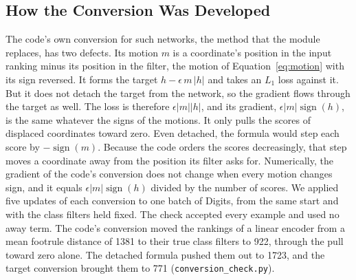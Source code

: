 \subsection{How the Conversion Was Developed}\label{supp:learned-development}

The code's own conversion for such networks, the method that the module replaces, has two defects. Its motion $m$ is a coordinate's position in the input ranking minus its position in the filter, the motion of Equation~\eqref{eq:motion} with its sign reversed. It forms the target $h-\epsilon\,m\,\lvert h\rvert$ and takes an $L_1$ loss against it. But it does not detach the target from the network, so the gradient flows through the target as well. The loss is therefore $\epsilon\lvert m\rvert\lvert h\rvert$, and its gradient, $\epsilon\lvert m\rvert\operatorname{sign}(h)$, is the same whatever the signs of the motions. It only pulls the scores of displaced coordinates toward zero. Even detached, the formula would step each score by $-\operatorname{sign}(m)$. Because the code orders the scores decreasingly, that step moves a coordinate away from the position its filter asks for. Numerically, the gradient of the code's conversion does not change when every motion changes sign, and it equals $\epsilon\lvert m\rvert\operatorname{sign}(h)$ divided by the number of scores. We applied five updates of each conversion to one batch of Digits, from the same start and with the class filters held fixed. The check accepted every example and used no away term. The code's conversion moved the rankings of a linear encoder from a mean footrule distance of 1381 to their true class filters to 922, through the pull toward zero alone. The detached formula pushed them out to 1723, and the target conversion brought them to 771 (\texttt{conversion\_check.py}).

